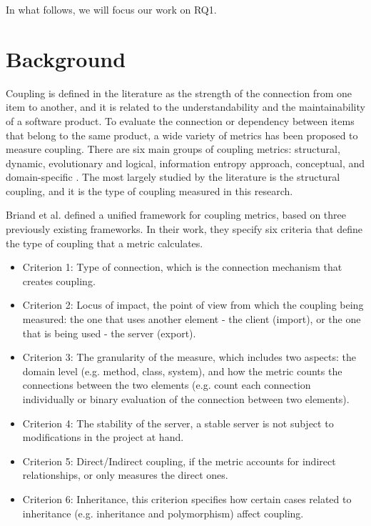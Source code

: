\documentclass[a4paper]{article}
\begin{document}
In what follows, we will focus our work on RQ1.

\section{Background}\label{section:Background}
Coupling is defined in the literature as the strength of the connection from one item to another, and it is related to the understandability and the maintainability of a software product. To evaluate the connection or dependency between items that belong to the same product, a wide variety of metrics has been proposed to measure coupling.
There are six main groups of coupling metrics: structural, dynamic, evolutionary and logical, information entropy approach, conceptual, and domain-specific  \cite{poshyvanyk2006conceptual}. The most largely studied by the literature is the structural coupling, and it is the type of coupling measured in this research.

Briand et al. \cite{briand1999unified} defined a unified framework for coupling metrics, based on three previously existing frameworks. In their work, they specify six criteria that define the type of coupling that a metric calculates.

\begin{itemize}
    \item Criterion 1: Type of connection, which is the connection mechanism that creates coupling.
    \item Criterion 2: Locus of impact, the point of view from which the coupling being measured: the one that uses another element - the client (import), or the one that is being used - the server (export).
    \item Criterion 3: The granularity of the measure, which includes two aspects: the domain level (e.g. method, class, system), and how the metric counts the connections between the two elements (e.g. count each connection individually or binary evaluation of the connection between two elements).
    \item Criterion 4: The stability of the server, a stable server is not subject to modifications in the project at hand.
    \item Criterion 5: Direct/Indirect coupling, if the metric accounts for indirect relationships, or only measures the direct ones.
    \item Criterion 6: Inheritance, this criterion specifies how certain cases related to inheritance (e.g. inheritance and polymorphism) affect coupling.
\end{itemize}
\end{document}
